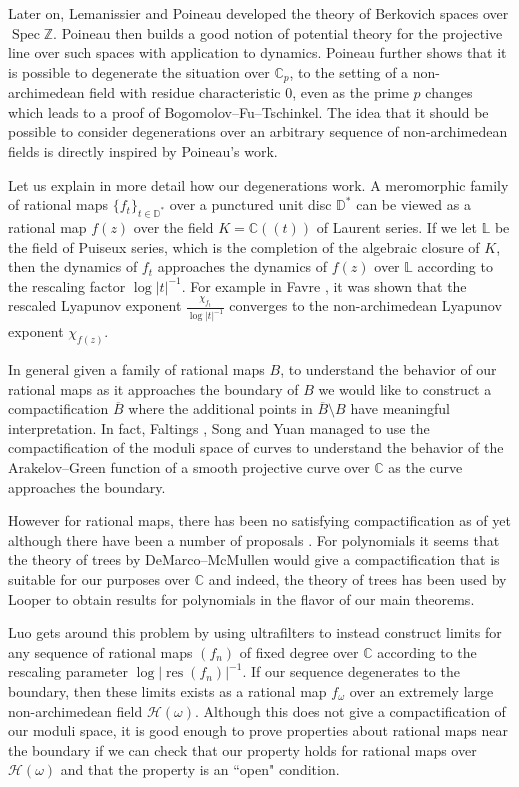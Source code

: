 \documentclass[10pt]{amsart}
\newcommand{\bb}{\mathbb}
\newcommand{\res}{\operatorname{res}}
\newcommand{\ovl}{\overline}
\newcommand{\cal}{\mathcal}
\newcommand{\Spec}{\operatorname{Spec}}
\numberwithin{theorem}{section}
\numberwithin{example}{section}
\numberwithin{definition}{section}
\begin{document}
Later on, Lemanissier and Poineau \cite{LP24} developed the theory of Berkovich spaces over $\Spec \bb{Z}$. Poineau \cite{Poi24a, Poi24b} then builds a good notion of potential theory for the projective line over such spaces with application to dynamics. Poineau further shows that it is possible to degenerate the situation over $\bb{C}_p$, to the setting of a non-archimedean field with residue characteristic $0$, even as the prime $p$ changes which leads to a proof of Bogomolov--Fu--Tschinkel. The idea that it should be possible to consider degenerations over an arbitrary sequence of non-archimedean fields is directly inspired by Poineau's work. 
\par 
Let us explain in more detail how our degenerations work. A meromorphic family of rational maps $\{f_t\}_{t \in \bb{D}^{*}}$ over a punctured unit disc $\bb{D}^{*}$ can be viewed as a rational map $f(z)$ over the field $K = \bb{C}((t))$ of Laurent series. If we let $\bb{L}$ be the field of Puiseux series, which is the completion of the algebraic closure of $K$, then the dynamics of $f_t$ approaches the dynamics of $f(z)$ over $\bb{L}$ according to the rescaling factor $\log |t|^{-1}$. For example in Favre \cite{Fav20}, it was shown that the rescaled Lyapunov exponent $\frac{\chi_{f_t}}{\log |t|^{-1}}$ converges to the non-archimedean Lyapunov exponent $\chi_{f(z)}$. 
\par 
In general given a family of rational maps $B$, to understand the behavior of our rational maps as it approaches the boundary of $B$ we would like to construct a compactification $\ovl{B}$ where the additional points in $\ovl{B} \setminus B$ have meaningful interpretation. In fact, Faltings \cite{Fal21}, Song \cite{Son23} and Yuan \cite{Yua24} managed to use the compactification of the moduli space of curves to understand the behavior of the Arakelov--Green function of a smooth projective curve over $\bb{C}$ as the curve approaches the boundary. 
\par 
However for rational maps, there has been no satisfying compactification as of yet although there have been a number of proposals \cite{Sil98, Dem07}. For polynomials it seems that the theory of trees by DeMarco--McMullen \cite{DeM08} would give a compactification that is suitable for our purposes over $\bb{C}$ and indeed, the theory of trees has been used by Looper \cite{Loo19, Loo21, Loo21b} to obtain results for polynomials in the flavor of our main theorems. 
\par 
Luo \cite{Luo21, Luo22} gets around this problem by using ultrafilters to instead construct limits for any sequence of rational maps $(f_n)$ of fixed degree over $\bb{C}$ according to the rescaling parameter $\log |\res(f_n)|^{-1}$. If our sequence degenerates to the boundary, then these limits exists as a rational map $f_{\omega}$ over an extremely large non-archimedean field $\cal{H}(\omega)$. Although this does not give a compactification of our moduli space, it is good enough to prove properties about rational maps near the boundary if we can check that our property holds for rational maps over $\cal{H}(\omega)$ and that the property is an ``open" condition. 
\end{document}
